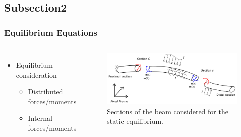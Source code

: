 \documentclass[compress]{thesisbeamer}
\begin{document}
        \subsection{Subsection2}
        \begin{frame}
        	\frametitle{Equilibrium Equations}
			\begin{columns}
			\begin{itemize}%
  				\item Equilibrium consideration
  				\begin{itemize}%
   					\item Distributed forces/moments
   					\item Internal forces/moments
  				\end{itemize}
 			\end{itemize}
			\vspace{2cm}
			\begin{figure}[h]
				\centering
				\includegraphics[width=\textwidth]{images/equilibrium}
				\caption{Sections of the beam considered for the static equilibrium.}
			\end{figure}
			\end{columns}
		\end{frame}
\end{document}
